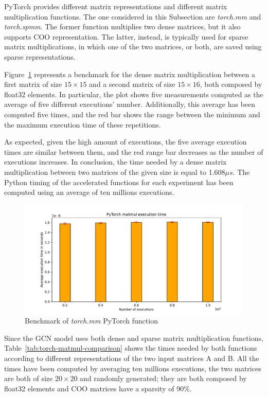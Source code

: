 PyTorch provides different matrix representations and different matrix multiplication functions.
The one considered in this Subsection are \textit{torch.mm} and \textit{torch.spmm}.
The former function multiplies two dense matrices, but it also supports COO representation.
The latter, instead, is typically used for sparse matrix multiplications, in which one of the two matrices, or both, are saved using sparse representations.

Figure~\ref{fig:torch-mm_benchmark} represents a benchmark for the dense matrix multiplication between a first matrix of size $15 \times 15$ and a second matrix of size $15 \times 16$, both composed by float32 elements.
In particular, the plot shows five measurements computed as the average of five different executions' number.
Additionally, this average has been computed five times, and the red bar shows the range between the minimum and the maximum execution time of these repetitions.

As expected, given the high amount of executions, the five average execution times are similar between them, and the red range bar decreases as the number of executions increases.
In conclusion, the time needed by a dense matrix multiplication between two matrices of the given size is equal to 1.608$\mu s$.
The Python timing of the accelerated functions for each experiment has been computed using an average of ten millions executions.

\begin{figure}[t]
    \centering
    \includegraphics[height=0.4\textwidth]{Images/torch-mm_benchmark}
    \caption{Benchmark of \textit{torch.mm} PyTorch function}
    \label{fig:torch-mm_benchmark}
\end{figure}

Since the GCN model uses both dense and sparse matrix multiplication functions, Table~\ref{tab:torch-matmul-comparison} shows the times needed by both functions according to different representations of the two input matrices A and B\@.
All the times have been computed by averaging ten millions executions, the two matrices are both of size $20 \times 20$ and randomly generated; they are both composed by float32 elements and COO matrices have a sparsity of 90\%.

